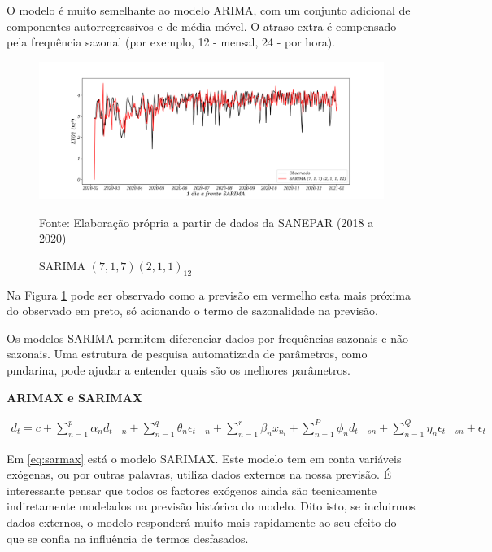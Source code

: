 O modelo é muito semelhante ao modelo ARIMA, com um conjunto adicional de componentes autorregressivos e de média móvel. O atraso extra é compensado pela frequência sazonal (por exemplo, 12 - mensal, 24 - por hora). 

\begin{figure}[H]
	\centering
	\caption{SARIMA $(7,1,7) (2,1,1)_{12}$}
	\label{fig:1-sarima}
	\includegraphics[width=1\linewidth]{Modelos/Figuras/1-SARIMA}
	
	Fonte: Elaboração própria a partir de dados da SANEPAR (2018 a 2020)
\end{figure}

Na Figura \ref{fig:1-sarima} pode ser observado como a previsão em vermelho esta mais próxima do observado em preto, só acionando o termo de sazonalidade na previsão. 

Os modelos SARIMA permitem diferenciar dados por frequências sazonais e não sazonais. Uma estrutura de pesquisa automatizada de parâmetros, como pmdarina, pode ajudar a entender quais são os melhores parâmetros.

\textbf{ARIMAX e SARIMAX}

\begin{eqnarray}
	d_t=c+\sum_{n=1}^p \alpha_n d_{t-n}+\sum_{n=1}^q \theta_n \epsilon_{t-n}+\sum_{n=1}^r \beta_n x_{n_t}+\sum_{n=1}^P \phi_n d_{t-s n}+\sum_{n=1}^Q \eta_n \epsilon_{t-s n}+\epsilon_t \label{eq:sarmax}
\end{eqnarray}

Em \eqref{eq:sarmax} está o modelo SARIMAX. Este modelo tem em conta variáveis exógenas, ou por outras palavras, utiliza dados externos na nossa previsão. É interessante pensar que todos os factores exógenos ainda são tecnicamente indiretamente modelados na previsão histórica do modelo. Dito isto, se incluirmos dados externos, o modelo responderá muito mais rapidamente ao seu efeito do que se confia na influência de termos desfasados.

